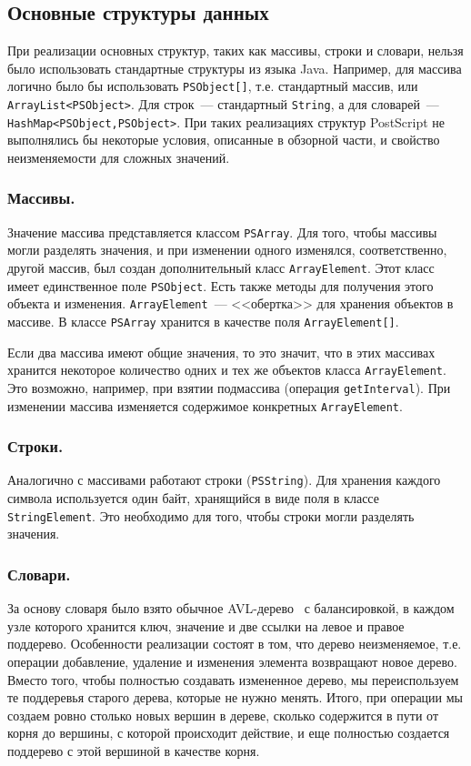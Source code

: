 \subsection{Основные структуры данных}
При реализации основных структур, таких как массивы, строки и словари, нельзя было использовать стандартные структуры из языка Java. Например, для массива логично было бы использовать \texttt{PSObject[]}, т.е. стандартный массив, или \texttt{ArrayList<PSObject>}. Для строк~--- стандартный \texttt{String}, а для словарей~--- \texttt{HashMap<PSObject,PSObject>}. При таких реализациях структур PostScript не выполнялись бы некоторые условия, описанные в обзорной части, и свойство неизменяемости для сложных значений.

\subsubsection*{Массивы.}
Значение массива представляется классом \texttt{PSArray}. Для того, чтобы массивы могли разделять значения, и при изменении одного изменялся, соответственно, другой массив, был создан дополнительный класс \texttt{ArrayElement}. Этот класс имеет единственное поле \texttt{PSObject}. Есть также методы для получения этого объекта и изменения. \texttt{ArrayElement}~--- <<обертка>> для хранения объектов в массиве. В классе \texttt{PSArray} хранится в качестве поля \texttt{ArrayElement[]}. 

Если два массива имеют общие значения, то это значит, что в этих массивах хранится некоторое количество одних и тех же объектов класса \texttt{ArrayElement}. Это возможно, например, при взятии подмассива (операция \texttt{getInterval}). При изменении массива изменяется содержимое конкретных \texttt{ArrayElement}.

\subsubsection*{Строки.}
Аналогично с массивами работают строки (\texttt{PSString}). Для хранения каждого символа используется один байт, хранящийся в виде поля в классе \texttt{StringElement}. Это необходимо для того, чтобы строки могли разделять значения.

\subsubsection*{Словари.}
За основу словаря было взято обычное AVL-дерево~\cite{cormen} с балансировкой, в каждом узле которого хранится ключ, значение и две ссылки на левое и правое поддерево. Особенности реализации состоят в том, что дерево неизменяемое, т.е. операции добавление, удаление и изменения элемента возвращают новое дерево. Вместо того, чтобы полностью создавать измененное дерево, мы переиспользуем те поддеревья старого дерева, которые не нужно менять. Итого, при операции мы создаем  ровно столько новых вершин в дереве, сколько содержится в пути от корня до вершины, с которой происходит действие, и еще полностью создается поддерево с этой вершиной в качестве корня.

